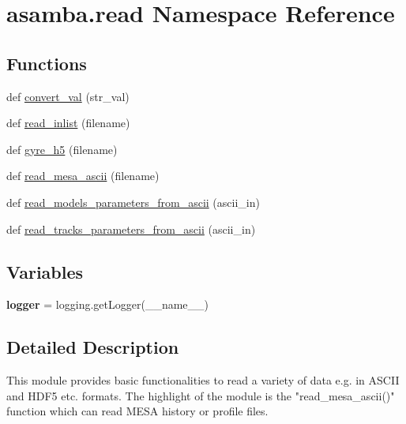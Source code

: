 \hypertarget{namespaceasamba_1_1read}{}\section{asamba.\+read Namespace Reference}
\label{namespaceasamba_1_1read}
\subsection*{Functions}
\begin{DoxyCompactItemize}
\item 
def \hyperlink{namespaceasamba_1_1read_ace4b0a61b1709d8ed716d72ee1970116}{convert\+\_\+val} (str\+\_\+val)
\item 
def \hyperlink{namespaceasamba_1_1read_a1506842017eb500635c24715c4336084}{read\+\_\+inlist} (filename)
\item 
def \hyperlink{namespaceasamba_1_1read_a9d452d521d54c77714542bea2e6e93fa}{gyre\+\_\+h5} (filename)
\item 
def \hyperlink{namespaceasamba_1_1read_ae83b875713bb96212678b765231b4687}{read\+\_\+mesa\+\_\+ascii} (filename)
\item 
def \hyperlink{namespaceasamba_1_1read_abb755ca6d69a403b2cbdc28d54eb0e24}{read\+\_\+models\+\_\+parameters\+\_\+from\+\_\+ascii} (ascii\+\_\+in)
\item 
def \hyperlink{namespaceasamba_1_1read_ad29a871a69a759e56c120bfc3d898702}{read\+\_\+tracks\+\_\+parameters\+\_\+from\+\_\+ascii} (ascii\+\_\+in)
\end{DoxyCompactItemize}
\subsection*{Variables}
\begin{DoxyCompactItemize}
\item 
\mbox{\label{namespaceasamba_1_1read_ae7575eddb0ba9f0b562ed6cc789969df}} 
{\bfseries logger} = logging.\+get\+Logger(\+\_\+\+\_\+name\+\_\+\+\_\+)
\end{DoxyCompactItemize}


\subsection{Detailed Description}
\begin{DoxyVerb}This module provides basic functionalities to read a variety of data e.g. in ASCII 
and HDF5 etc. formats. The highlight of the module is the "read_mesa_ascii()" function
which can read MESA history or profile files.
\end{DoxyVerb}
 

